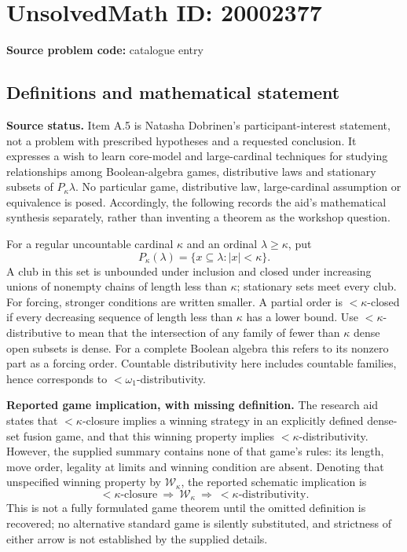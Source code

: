 \documentclass[11pt]{article}
\begin{document}
\section*{UnsolvedMath ID: 20002377}
\textbf{Source problem code:} catalogue entry
\subsection{Definitions and mathematical statement}
\textbf{Source status.} Item A.5 is Natasha Dobrinen's participant-interest statement, not a problem with prescribed hypotheses and a requested conclusion. It expresses a wish to learn core-model and large-cardinal techniques for studying relationships among Boolean-algebra games, distributive laws and stationary subsets of \(P_\kappa\lambda\). No particular game, distributive law, large-cardinal assumption or equivalence is posed. Accordingly, the following records the aid's mathematical synthesis separately, rather than inventing a theorem as the workshop question.

For a regular uncountable cardinal \(\kappa\) and an ordinal \(\lambda\geq\kappa\), put
\[
 P_\kappa(\lambda)=\{x\subseteq\lambda:|x|<\kappa\}.
\]
A club in this set is unbounded under inclusion and closed under increasing unions of nonempty chains of length less than \(\kappa\); stationary sets meet every club. For forcing, stronger conditions are written smaller. A partial order is \(<\kappa\)-closed if every decreasing sequence of length less than \(\kappa\) has a lower bound. Use \(<\kappa\)-distributive to mean that the intersection of any family of fewer than \(\kappa\) dense open subsets is dense. For a complete Boolean algebra this refers to its nonzero part as a forcing order. Countable distributivity here includes countable families, hence corresponds to \(<\omega_1\)-distributivity.

\textbf{Reported game implication, with missing definition.} The research aid states that \(<\kappa\)-closure implies a winning strategy in an explicitly defined dense-set fusion game, and that this winning property implies \(<\kappa\)-distributivity. However, the supplied summary contains none of that game's rules: its length, move order, legality at limits and winning condition are absent. Denoting that unspecified winning property by \(\mathcal W_\kappa\), the reported schematic implication is
\[
 <\kappa\text{-closure}\ \Longrightarrow\ \mathcal W_\kappa
 \ \Longrightarrow\ <\kappa\text{-distributivity}.
\]
This is not a fully formulated game theorem until the omitted definition is recovered; no alternative standard game is silently substituted, and strictness of either arrow is not established by the supplied details.
\end{document}
